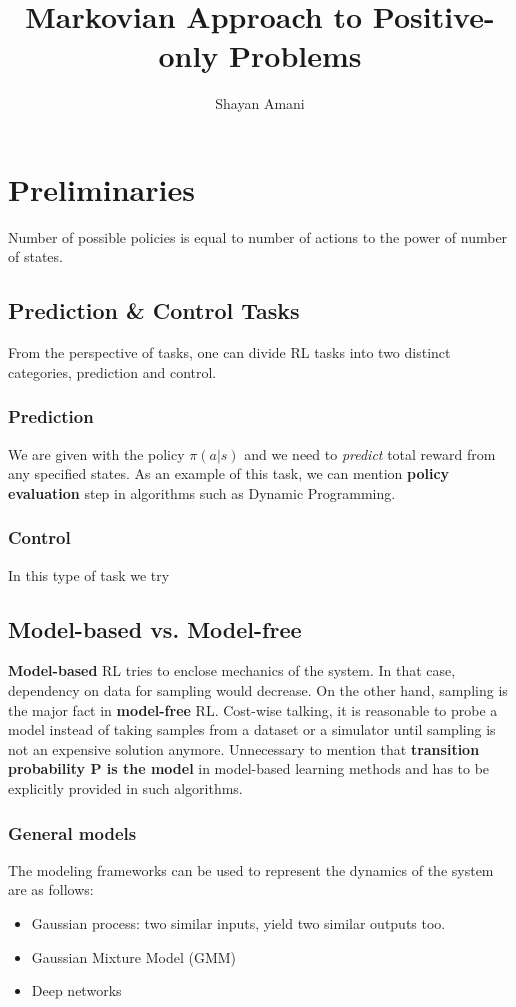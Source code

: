 \documentclass[a4paper,12pt]{article}
\title{Markovian Approach to Positive-only Problems}
\author{Shayan Amani}
\begin{document}
\maketitle

\section{Preliminaries}
Number of possible policies is equal to number of actions to the power of number of states.

\subsection{Prediction \& Control Tasks}
From the perspective of tasks, one can divide RL tasks into two distinct categories, prediction and control.

\subsubsection{Prediction}
We are given with the policy $\pi(a|s)$ and we need to \textit{predict} total reward from any specified states. As an example of this task, we can mention \textbf{policy evaluation} step in algorithms such as Dynamic Programming.

\subsubsection{Control}
In this type of task we try

\subsection{Model-based vs. Model-free}
\textbf{Model-based} RL tries to enclose mechanics of the system. In that case, dependency on data for sampling would decrease. On the other hand, sampling is the major fact in \textbf{model-free} RL. Cost-wise talking, it is reasonable to probe a model instead of taking samples from a dataset or a simulator until sampling is not an expensive solution anymore. Unnecessary to mention that \textbf{transition probability P is the model} in model-based learning methods and has to be explicitly provided in such algorithms.

\subsubsection{General models}
The modeling frameworks can be used to represent the dynamics of the system are as follows:
\begin{itemize}
    \item Gaussian process: two similar inputs, yield two similar outputs too.
    \item Gaussian Mixture Model (GMM)
    \item Deep networks
\end{itemize}
\end{document}

